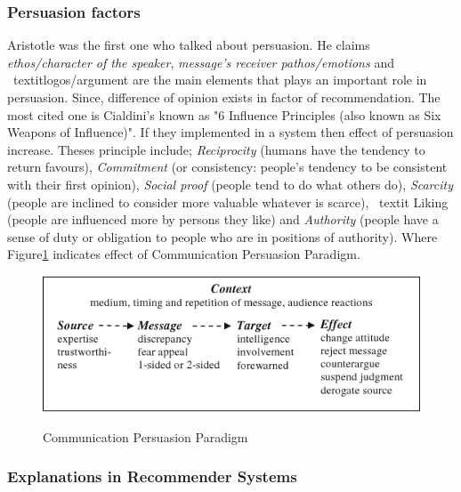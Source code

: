 \subsubsection{Persuasion factors}

Aristotle \cite{gkika2014persuasive} was the first one who talked about persuasion. He claims \textit{ethos/character of the speaker}, \textit {message’s receiver pathos/emotions} and \ textit{logos/argument} are the main elements that plays an important role in persuasion. Since, difference of opinion exists in factor of recommendation. The most cited one is  Cialdini’s \cite{cialdini2009influence} known as "6 Influence Principles (also known as Six Weapons of Influence)". If they implemented in a system then effect of persuasion increase. Theses principle include; \textit{ Reciprocity} (humans have the tendency to return favours), \textit{ Commitment }(or consistency: people’s tendency to be consistent with their first opinion), \textit{ Social proof }(people tend to do what others do), \textit{ Scarcity} (people are inclined to consider more valuable whatever is scarce), \ textit{ Liking }(people are influenced more by persons they like) and  \textit{ Authority} (people have a sense of duty or obligation to people who are in positions of authority). Where Figure\ref{fig:ch2_communication_persuasion_paradigm} indicates effect of Communication Persuasion Paradigm\cite{yoo2012persuasive}.

\begin{figure}[h]
	\centering
	\includegraphics[width=1\linewidth]{figures/ch2_communication_persuasion_paradigm.png}
	\caption{Communication Persuasion Paradigm}
	\cite{yoo2012persuasive}
	\label{fig:ch2_communication_persuasion_paradigm}
\end{figure}

\newpage
\subsubsection{Explanations in Recommender Systems}

